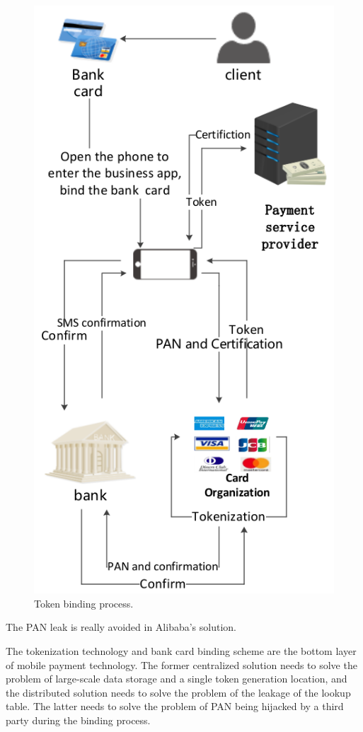 \documentclass[journal]{IEEEtran}
\begin{document}
\begin{figure}[htbp]
\centerline{\includegraphics[scale=0.5]{tsp2.png}}
\caption{Token binding process.}
\label{fig}
\end{figure}

The PAN leak is really avoided in Alibaba's solution.

The tokenization technology and bank card binding scheme are the bottom layer of mobile payment technology. The former centralized solution needs to solve the problem of large-scale data storage and a single token generation location, and the distributed solution needs to solve the problem of the leakage of the lookup table. The latter needs to solve the problem of PAN being hijacked by a third party during the binding process.
\end{document}
